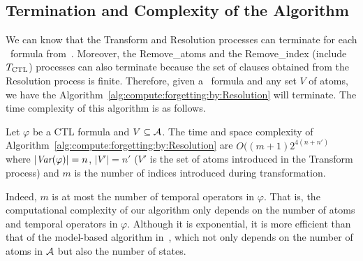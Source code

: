 \documentclass[letterpaper]{article} %
\begin{document}
\subsection{Termination and Complexity of the Algorithm}





We can know that the Transform and Resolution processes can terminate for each \CTL\ formula from~\cite{zhang2014resolution}. Moreover, the Remove\_atoms and the Remove\_index (include $T_{\textrm{CTL}}$) processes can also terminate because the set of clauses obtained from the Resolution process is finite. Therefore, given a \CTL\ formula and any set $V$ of atoms, we have the Algorithm~\ref{alg:compute:forgetting:by:Resolution} will terminate. 
The time complexity of this algorithm is as follows.


\begin{proposition}\label{pro:complexity}
Let $\varphi$ be a CTL formula and $V \subseteq {\cal A}$.
The time and space complexity of Algorithm~\ref{alg:compute:forgetting:by:Resolution} are $O((m+1)2^{4(n+n')}$ where $|\textit{Var}(\varphi)|=n$, $|V'|=n'$ ($V'$ is the set of atoms introduced in the Transform process) and $m$ is the number of indices introduced during transformation.
\end{proposition}

Indeed, $m$ is at most the number of  temporal  operators in $\varphi$.
That is, the computational complexity of our algorithm only depends on the number of atoms and temporal operators in $\varphi$. 
Although it is exponential, it is more efficient than that of the model-based algorithm in~\cite{renyansfirstpaper}, which not only depends on the number of atoms in ${\cal A}$ but also the number of states.
\end{document}
